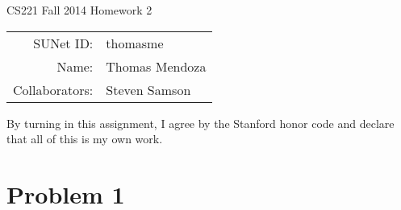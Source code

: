 \documentclass[12pt]{article}
\begin{document}
\begin{center}
{\Large CS221 Fall 2014 Homework 2}

\begin{tabular}{rl}
SUNet ID: & thomasme \\
Name: & Thomas Mendoza \\
Collaborators: & Steven Samson
\end{tabular}
\end{center}

By turning in this assignment, I agree by the Stanford honor code and declare
that all of this is my own work.

	\section*{Problem 1}
\end{document}
